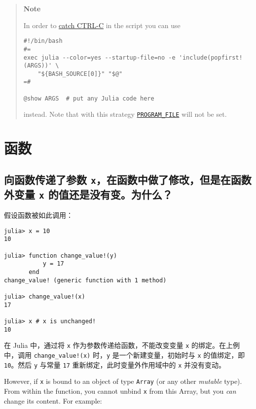 \begin{quote}
\textbf{Note}

In order to \hyperlink{15294909856889946817}{catch CTRL-C} in the script you can use


\begin{verbatim}
#!/bin/bash
#=
exec julia --color=yes --startup-file=no -e 'include(popfirst!(ARGS))' \
    "${BASH_SOURCE[0]}" "$@"
=#

@show ARGS  # put any Julia code here
\end{verbatim}

instead. Note that with this strategy \hyperlink{9054270179006636705}{\texttt{PROGRAM\_FILE}} will not be set.

\end{quote}


\hypertarget{5727276226756196747}{}


\section{函数}



\hypertarget{7382572299104431822}{}


\subsection{向函数传递了参数 \texttt{x}，在函数中做了修改，但是在函数外变量 \texttt{x} 的值还是没有变。为什么？}



假设函数被如此调用：




\begin{verbatim}
julia> x = 10
10

julia> function change_value!(y)
           y = 17
       end
change_value! (generic function with 1 method)

julia> change_value!(x)
17

julia> x # x is unchanged!
10
\end{verbatim}



在 Julia 中，通过将 \texttt{x} 作为参数传递给函数，不能改变变量 \texttt{x} 的绑定。在上例中，调用 \texttt{change\_value!(x)} 时，\texttt{y} 是一个新建变量，初始时与 \texttt{x} 的值绑定，即 \texttt{10}。然后 \texttt{y} 与常量 \texttt{17} 重新绑定，此时变量外作用域中的 \texttt{x} 并没有变动。



However, if \texttt{x} is bound to an object of type \texttt{Array} (or any other \emph{mutable} type). From within the function, you cannot {\textquotedbl}unbind{\textquotedbl} \texttt{x} from this Array, but you \emph{can} change its content. For example:




